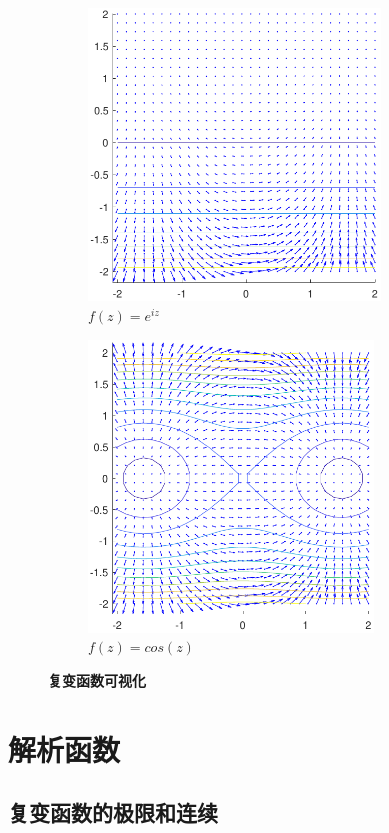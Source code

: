 \documentclass[UTF8]{report}
\theoremstyle{MyLineTheoremStyle} %
\theoremstyle{MyBlockTheoremStyle} %
\theoremstyle{MySubsubsectionStyle} %
\begin{document}
\begin{figure}[H]\centering
    \begin{subfigure}[t]{0.49\textwidth}\centering
        \includegraphics[height=220pt]{assets/1,2/e^(iz).pdf}
        \caption{\bfseries $f(z) = e^{iz}$ }
    \end{subfigure}\begin{subfigure}[t]{0.49\textwidth}\centering
        \includegraphics[height=220pt]{assets/1,2/cos(iz).pdf}
        \caption{\bfseries $f(z) = cos(z)$ }
    \end{subfigure}
    \caption{\bfseries 复变函数可视化 }\label{可视化2}
\end{figure}

\chapter{解析函数}\thispagestyle{fancy}

\section{复变函数的极限和连续}
\end{document}
